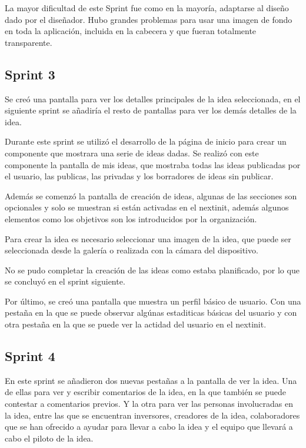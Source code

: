 La mayor dificultad de este Sprint fue como en la mayoría, adaptarse al diseño dado por el diseñador. Hubo grandes problemas
para usar una imagen de fondo en toda la aplicación, incluida en la cabecera y que fueran totalmente transparente.

\subsection{Sprint 3}

Se creó una pantalla para ver los detalles principales de la idea seleccionada, en el siguiente sprint se añadiría el resto de pantallas para ver los demás detalles de la idea.

Durante este sprint se utilizó el desarrollo de la página de inicio para crear un componente que mostrara una serie de ideas dadas. Se realizó con este componente la pantalla de mis ideas, que mostraba todas las ideas
 publicadas por el  usuario, las publicas, las privadas y los borradores de ideas sin publicar.

Además se comenzó la pantalla de creación de ideas, algunas de las secciones son opcionales y solo se
 muestran si están activadas en el nextinit, además algunos elementos como los objetivos son los introducidos
 por la organización. 

Para crear la idea es necesario seleccionar una imagen de la idea, que puede ser seleccionada desde la galería o realizada con la cámara 
del dispositivo.

No se pudo completar la creación de las ideas como estaba planificado, por lo que se concluyó en el sprint siguiente.

Por último, se creó una pantalla que muestra un perfil básico de usuario. Con una pestaña en la que se puede observar algúnas estaditicas básicas del usuario y con otra pestaña en la que se puede ver la actidad del usuario en el nextinit.

\subsection{Sprint 4}

En este sprint se añadieron dos nuevas pestañas a la pantalla de ver la idea. Una de ellas para ver y escribir comentarios de la idea, 
en la que también se puede contestar a comentarios previos. Y la otra para ver las personas involucradas en la idea, entre 
las que se encuentran inversores, creadores de la idea, colaboradores que se han ofrecido a ayudar para llevar a cabo la idea y el equipo 
que llevará a cabo el piloto de la idea.

